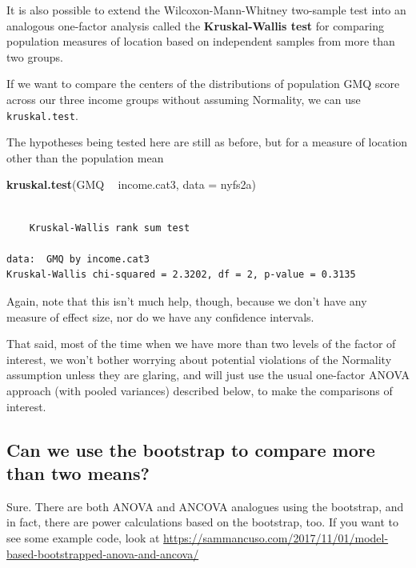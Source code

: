 \documentclass[
]{book}
\newenvironment{Shaded}{\begin{snugshade}}{\end{snugshade}}
\newcommand{\DataTypeTok}[1]{\textcolor[rgb]{0.13,0.29,0.53}{#1}}
\newcommand{\KeywordTok}[1]{\textcolor[rgb]{0.13,0.29,0.53}{\textbf{#1}}}
\newcommand{\NormalTok}[1]{#1}
\newcommand{\OperatorTok}[1]{\textcolor[rgb]{0.81,0.36,0.00}{\textbf{#1}}}
\newcommand{\StringTok}[1]{\textcolor[rgb]{0.31,0.60,0.02}{#1}}
\begin{document}
It is also possible to extend the Wilcoxon-Mann-Whitney two-sample test into an analogous one-factor analysis called the \textbf{Kruskal-Wallis test} for comparing population measures of location based on independent samples from more than two groups.

If we want to compare the centers of the distributions of population GMQ score across our three income groups without assuming Normality, we can use \texttt{kruskal.test}.

The hypotheses being tested here are still as before, but for a measure of location other than the population mean

\begin{Shaded}
\begin{Highlighting}[]
\KeywordTok{kruskal.test}\NormalTok{(GMQ }\OperatorTok{~}\StringTok{ }\NormalTok{income.cat3, }\DataTypeTok{data =}\NormalTok{ nyfs2a)}
\end{Highlighting}
\end{Shaded}

\begin{verbatim}

	Kruskal-Wallis rank sum test

data:  GMQ by income.cat3
Kruskal-Wallis chi-squared = 2.3202, df = 2, p-value = 0.3135
\end{verbatim}

Again, note that this isn't much help, though, because we don't have any measure of effect size, nor do we have any confidence intervals.

That said, most of the time when we have more than two levels of the factor of interest, we won't bother worrying about potential violations of the Normality assumption unless they are glaring, and will just use the usual one-factor ANOVA approach (with pooled variances) described below, to make the comparisons of interest.

\hypertarget{can-we-use-the-bootstrap-to-compare-more-than-two-means}{%
\subsection{Can we use the bootstrap to compare more than two means?}\label{can-we-use-the-bootstrap-to-compare-more-than-two-means}}

Sure. There are both ANOVA and ANCOVA analogues using the bootstrap, and in fact, there are power calculations based on the bootstrap, too. If you want to see some example code, look at \url{https://sammancuso.com/2017/11/01/model-based-bootstrapped-anova-and-ancova/}
\end{document}
